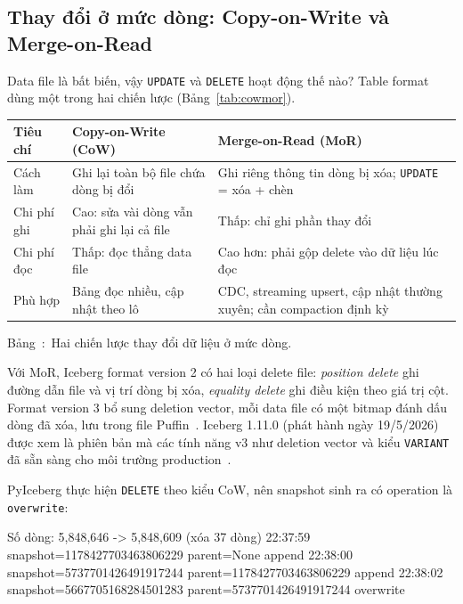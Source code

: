\documentclass[12pt]{article}
\newenvironment{figblock}{\par\medskip\noindent\begin{minipage}{\linewidth}}{\end{minipage}\par\medskip}
\newcounter{bang}
\newcommand{\tabcap}[2]{%
  \begin{captionbelowboxaivn}\refstepcounter{bang}Bảng~\thebang:~#1\label{#2}\end{captionbelowboxaivn}}
\begin{document}
\subsection{Thay đổi ở mức dòng: Copy-on-Write và Merge-on-Read}

Data file là bất biến, vậy \texttt{UPDATE} và \texttt{DELETE} hoạt động thế nào? Table format dùng một trong hai chiến lược (Bảng~\ref{tab:cowmor}).

\begin{figblock}\begin{center}
\renewcommand{\arraystretch}{1.3}
\begin{tabularx}{\linewidth}{|P{2.4cm}|L|L|}
\hline
{}
\textbf{Tiêu chí} & \textbf{Copy-on-Write (CoW)} & \textbf{Merge-on-Read (MoR)} \\
\hline
Cách làm & Ghi lại toàn bộ file chứa dòng bị đổi & Ghi riêng thông tin dòng bị xóa; \texttt{UPDATE} = xóa + chèn \\
\hline
Chi phí ghi & Cao: sửa vài dòng vẫn phải ghi lại cả file & Thấp: chỉ ghi phần thay đổi \\
\hline
Chi phí đọc & Thấp: đọc thẳng data file & Cao hơn: phải gộp delete vào dữ liệu lúc đọc \\
\hline
Phù hợp & Bảng đọc nhiều, cập nhật theo lô & CDC, streaming upsert, cập nhật thường xuyên; cần compaction định kỳ \\
\hline
\end{tabularx}
\end{center}
\tabcap{Hai chiến lược thay đổi dữ liệu ở mức dòng.}{tab:cowmor}
\end{figblock}

Với MoR, Iceberg format version 2 có hai loại delete file: \textit{position delete} ghi đường dẫn file và vị trí dòng bị xóa, \textit{equality delete} ghi điều kiện theo giá trị cột. Format version 3 bổ sung deletion vector, mỗi data file có một bitmap đánh dấu dòng đã xóa, lưu trong file Puffin~\cite{iceberg2026spec}. Iceberg 1.11.0 (phát hành ngày 19/5/2026) được xem là phiên bản mà các tính năng v3 như deletion vector và kiểu \texttt{VARIANT} đã sẵn sàng cho môi trường production~\cite{iceberg2026releases,dremio2026iceberg111}.

PyIceberg thực hiện \texttt{DELETE} theo kiểu CoW, nên snapshot sinh ra có operation là \texttt{overwrite}:

\begin{aivnCodeOutput}
\begin{python}
Số dòng: 5,848,646 -> 5,848,609 (xóa 37 dòng)
  22:37:59  snapshot=1178427703463806229  parent=None                 append
  22:38:00  snapshot=5737701426491917244  parent=1178427703463806229  append
  22:38:02  snapshot=5667705168284501283  parent=5737701426491917244  overwrite
\end{python}
\end{aivnCodeOutput}
\end{document}
